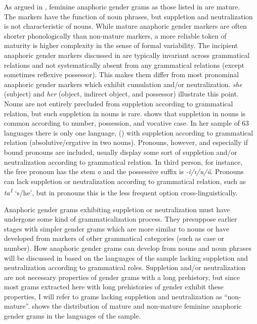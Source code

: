 \documentclass[output=collectionpaper]{langsci/langscibook}
\begin{document}
\newpage 
As argued in , feminine anaphoric gender grams as those listed in  are mature. The markers have the function of noun phrases, but suppletion and neutralization is not characteristic of nouns. While mature anaphoric gender markers are often shorter phonologically than non-mature markers, a more reliable token of maturity is higher complexity in the sense of formal variability. The incipient anaphoric gender markers discussed in  are typically invariant across grammatical relations and not systematically absent from any grammatical relations (except sometimes reflexive possessor). This makes them differ from most pronominal anaphoric gender markers which exhibit cumulation and/or neutralization.  \textit{she} (subject) and \textit{her} (object, indirect object, and possessor) illustrate this point. Nouns are not entirely precluded from suppletion according to grammatical relation, but such suppletion in nouns is rare. \citet{Vafaeian2013} shows that suppletion in nouns is common according to number, possession, and vocative case. In her sample of 63 languages there is only one language,  () with suppletion according to grammatical relation (absolutive/ergative in two nouns). Pronouns, however, and especially if bound pronouns are included, usually display some sort of suppletion and/or neutralization according to grammatical relation. In  third person, for instance, the free pronoun has the stem \textit{o} and the possessive suffix is \textit{-i/ı/u/ü}. Pronouns can lack suppletion or neutralization according to grammatical relation, such as   \textit{ta\textsuperscript{1}} ‘s/he’, but in pronouns this is the less frequent option cross-linguistically.

Anaphoric gender grams exhibiting suppletion or neutralization must have undergone some kind of grammaticalization process. They presuppose earlier stages with simpler gender grams which are more similar to nouns or have developed from markers of other grammatical categories (such as case or number). How anaphoric gender grams can develop from nouns and noun phrases will be discussed in  based on the languages of the sample lacking suppletion and neutralization according to grammatical roles. Suppletion and/or neutralization are not necessary properties of gender grams with a long prehistory, but since most grams extracted here with long prehistories of gender exhibit these properties, I will refer to grams lacking suppletion and neutralization as “non-mature”.  shows the distribution of mature and non-mature feminine anaphoric gender grams in the languages of the sample.
\end{document}
